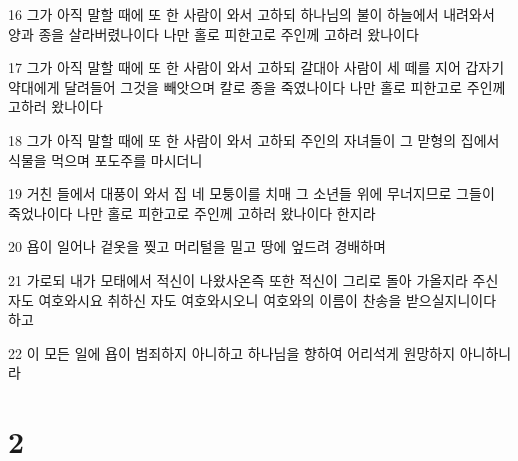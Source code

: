 \par 16 그가 아직 말할 때에 또 한 사람이 와서 고하되 하나님의 불이 하늘에서 내려와서 양과 종을 살라버렸나이다 나만 홀로 피한고로 주인께 고하러 왔나이다
\par 17 그가 아직 말할 때에 또 한 사람이 와서 고하되 갈대아 사람이 세 떼를 지어 갑자기 약대에게 달려들어 그것을 빼앗으며 칼로 종을 죽였나이다 나만 홀로 피한고로 주인께 고하러 왔나이다
\par 18 그가 아직 말할 때에 또 한 사람이 와서 고하되 주인의 자녀들이 그 맏형의 집에서 식물을 먹으며 포도주를 마시더니
\par 19 거친 들에서 대풍이 와서 집 네 모퉁이를 치매 그 소년들 위에 무너지므로 그들이 죽었나이다 나만 홀로 피한고로 주인께 고하러 왔나이다 한지라
\par 20 욥이 일어나 겉옷을 찢고 머리털을 밀고 땅에 엎드려 경배하며
\par 21 가로되 내가 모태에서 적신이 나왔사온즉 또한 적신이 그리로 돌아 가올지라 주신 자도 여호와시요 취하신 자도 여호와시오니 여호와의 이름이 찬송을 받으실지니이다 하고
\par 22 이 모든 일에 욥이 범죄하지 아니하고 하나님을 향하여 어리석게 원망하지 아니하니라

\chapter{2}

